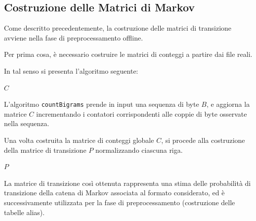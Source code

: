 \documentclass{report}
\begin{document}
\subsection{Costruzione delle Matrici di Markov}

Come descritto precedentemente, la costruzione delle matrici di transizione avviene
nella fase di preprocessamento offline.

\bigskip

Per prima cosa, è necessario costruire le matrici di conteggi a partire dai file reali.

In tal senso si presenta l'algoritmo seguente:

\bigskip

\begin{algorithm}[H]
\caption{countBigrams}




\Return $C$\;
\end{algorithm}

\bigskip

L'algoritmo \texttt{countBigrams} prende in input una sequenza di byte \(B\), e aggiorna la matrice \(C\) incrementando i contatori
corrispondenti alle coppie di byte osservate nella sequenza.

\bigskip

Una volta costruita la matrice di conteggi globale \(C\), si procede alla
costruzione della matrice di transizione \(P\) normalizzando ciascuna riga.

\bigskip    

\begin{algorithm}[H]
\caption{normalizeRows}



\Return $P$\;
\end{algorithm}

\bigskip

La matrice di transizione così ottenuta rappresenta una stima delle
probabilità di transizione della catena di Markov associata al formato
considerato, ed è successivamente utilizzata per la fase di
preprocessamento (costruzione delle tabelle alias).
\end{document}
